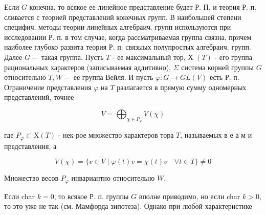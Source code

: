\documentclass[10pt]{article}
\begin{document}
Если $G$ конечна, то всякое ее линейное представление будет Р. П. и теория Р. п. сливается с теорией представлений конечных групп. В наибольшей степени специфич. методы теории линейных алгебраич. групп используются при исследовании Р. п. в том случае, когда рассматриваемая группа связна, причем наиболее глубоко развита теория Р. п. связыых полупростых алгебраич. групп. Далее $G-$ такая группа. Пусть $T$ - ее максимальный тор, Х $(T)$ - его группа рациональных характеров (записываемая аддитивно), $\Sigma$ система корней группы $G$ относительно $T, W-$ ее группа Вейля. И пусть $\varphi: G \rightarrow G L(V)$ есть Р. п. Ограничение представления $\varphi$ на $T$ разлагается в прямую сумму одномерных представлений, точнее



\[

V=\bigoplus_{\chi \in P_{\varphi}} V(\chi)

\]



где $P_{\varphi} \subset \mathrm{X}(T)$ - нек-рое множество характеров тора $T$, называемых в е а м и представления, а



\[

V(\chi)=\{v \in V \mid \varphi(t) v=\chi(t) v \quad \forall t \in T\} \neq 0

\]



Множество весов $P_{\varphi}$ инвариантно относительно $W$.



Если char $k=0$, то всякое Р. п. группы $G$ вполне приводимо, но если char $k>0$, то это уже не так (см. Мамфорда зипотеза). Однако при любой характеристике
\end{document}
